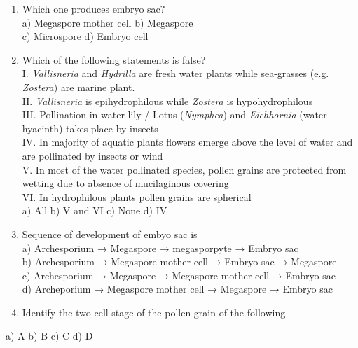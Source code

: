 \begin{enumerate}
\def\labelenumi{\arabic{enumi}.}
\setcounter{enumi}{134}
\item
  Which one produces embryo sac?\\
  a) Megaspore mother cell b) Megaspore\\
  c) Microspore d) Embryo cell
\item
  Which of the following statements is false?\\
  I. \emph{Vallisneria} and \emph{Hydrilla} are fresh water plants while
  sea-grasses (e.g. \emph{Zostera}) are marine plant.\\
  II. \emph{Vallisneria} is epihydrophilous while \emph{Zostera} is
  hypohydrophilous\\
  III. Pollination in water lily / Lotus (\emph{Nymphea}) and
  \emph{Eichhornia} (water hyacinth) takes place by insects\\
  IV. In majority of aquatic plants flowers emerge above the level of
  water and are pollinated by insects or wind\\
  V. In most of the water pollinated species, pollen grains are
  protected from wetting due to absence of mucilaginous covering\\
  VI. In hydrophilous plants pollen grains are spherical\\
  a) All b) V and VI c) None d) IV
\item
  Sequence of development of embyo sac is\\
  a) Archesporium → Megaspore → megasporpyte → Embryo sac\\
  b) Archesporium → Megaspore mother cell → Embryo sac → Megaspore\\
  c) Archesporium → Megaspore → Megaspore mother cell → Embryo sac\\
  d) Archeporium → Megaspore mother cell → Megaspore → Embryo sac
\item
  Identify the two cell stage of the pollen grain of the following
\end{enumerate}

a) A b) B c) C d) D

